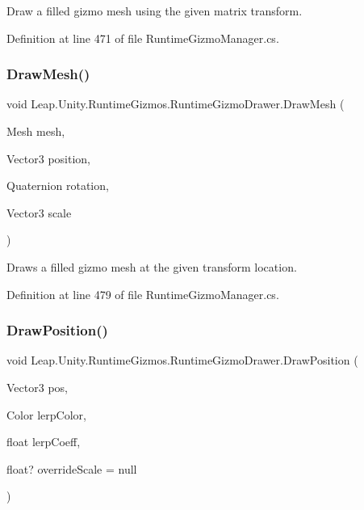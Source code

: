 Draw a filled gizmo mesh using the given matrix transform. 



Definition at line 471 of file Runtime\+Gizmo\+Manager.\+cs.

\mbox{\label{class_leap_1_1_unity_1_1_runtime_gizmos_1_1_runtime_gizmo_drawer_adf5c5b247aef1a68afdcdabdd3254f1c}} 
\subsubsection{\texorpdfstring{DrawMesh()}{DrawMesh()}\hspace{0.1cm}{\footnotesize\ttfamily [2/2]}}
{\footnotesize\ttfamily void Leap.\+Unity.\+Runtime\+Gizmos.\+Runtime\+Gizmo\+Drawer.\+Draw\+Mesh (\begin{DoxyParamCaption}\item[{Mesh}]{mesh,  }\item[{Vector3}]{position,  }\item[{Quaternion}]{rotation,  }\item[{Vector3}]{scale }\end{DoxyParamCaption})}



Draws a filled gizmo mesh at the given transform location. 



Definition at line 479 of file Runtime\+Gizmo\+Manager.\+cs.

\mbox{\label{class_leap_1_1_unity_1_1_runtime_gizmos_1_1_runtime_gizmo_drawer_afdee9da9941fbd020b25ef9c0ee2b73b}} 
\subsubsection{\texorpdfstring{DrawPosition()}{DrawPosition()}\hspace{0.1cm}{\footnotesize\ttfamily [1/3]}}
{\footnotesize\ttfamily void Leap.\+Unity.\+Runtime\+Gizmos.\+Runtime\+Gizmo\+Drawer.\+Draw\+Position (\begin{DoxyParamCaption}\item[{Vector3}]{pos,  }\item[{Color}]{lerp\+Color,  }\item[{float}]{lerp\+Coeff,  }\item[{float?}]{override\+Scale = {\ttfamily null} }\end{DoxyParamCaption})}



